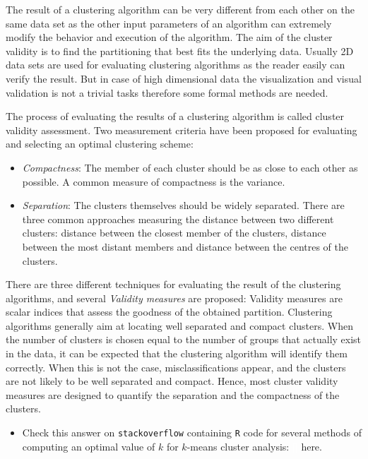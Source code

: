 \documentclass[]{book}
\newenvironment{rmdblock}[1]
  {\begin{shaded*}
  \begin{itemize}
  \renewcommand{\labelitemi}{
    \raisebox{-.7\height}[0pt][0pt]{
      {\setkeys{Gin}{width=2em,keepaspectratio}\texttt{[image: img/icons/\#1]}}
    }
  }
  \item
  }
  {
  \end{itemize}
  \end{shaded*}
  }
\newenvironment{rmdinsight}
  {\begin{rmdblock}{insight}}
  {\end{rmdblock}}
\theoremstyle{definition}
\theoremstyle{definition}
\theoremstyle{definition}
\theoremstyle{remark}
\begin{document}
The result of a clustering algorithm can be very different from each
other on the same data set as the other input parameters of an algorithm
can extremely modify the behavior and execution of the algorithm. The
aim of the cluster validity is to find the partitioning that best fits
the underlying data. Usually 2D data sets are used for evaluating
clustering algorithms as the reader easily can verify the result. But in
case of high dimensional data the visualization and visual validation is
not a trivial tasks therefore some formal methods are needed.

The process of evaluating the results of a clustering algorithm is
called cluster validity assessment. Two measurement criteria have been
proposed for evaluating and selecting an optimal clustering scheme:

\begin{itemize}
\item
  \emph{Compactness}: The member of each cluster should be as close to
  each other as possible. A common measure of compactness is the
  variance.
\item
  \emph{Separation}: The clusters themselves should be widely separated.
  There are three common approaches measuring the distance between two
  different clusters: distance between the closest member of the
  clusters, distance between the most distant members and distance
  between the centres of the clusters.
\end{itemize}

There are three different techniques for evaluating the result of the
clustering algorithms, and several \emph{Validity measures} are
proposed: Validity measures are scalar indices that assess the goodness
of the obtained partition. Clustering algorithms generally aim at
locating well separated and compact clusters. When the number of
clusters is chosen equal to the number of groups that actually exist in
the data, it can be expected that the clustering algorithm will identify
them correctly. When this is not the case, misclassifications appear,
and the clusters are not likely to be well separated and compact. Hence,
most cluster validity measures are designed to quantify the separation
and the compactness of the clusters.

\begin{rmdinsight}
Check this answer on \texttt{stackoverflow} containing \texttt{R} code
for several methods of computing an optimal value of \(k\) for
\(k\)-means cluster analysis:
\textcolor{white}{[}\faStackOverflow\textcolor{white}{]} here.
\end{rmdinsight}
\end{document}
